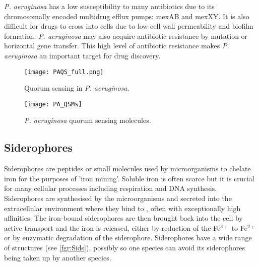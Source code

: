 \textit{P. aeruginosa} has a low susceptibility to many antibiotics due to its chromosomally encoded multidrug efflux pumps: mexAB and mexXY\cite{Poole2004}. It is also difficult for drugs to cross into cells due to low cell wall permeability and biofilm formation. \textit{P. aeruginosa} may also acquire antibiotic resistance by mutation or horizontal gene transfer\cite{cornelis2008pseudomonas}. This high level of antibiotic resistance makes \textit{P. aeruginosa} an important target for drug discovery.

\begin{figure}[H]
	\begin{center}
		\texttt{[image: PAQS\_full.png]}
		\caption{Quorum sensing in \textit{P. aeruginosa}\cite{Dubern2008}. \label{fgr:PA_QS}}
	\end{center}
\end{figure}


\begin{figure}[H]
	\begin{center}
		\texttt{[image: PA\_QSMs]}
		\caption{\textit{P. aeruginosa} quorum sensing molecules. \label{fgr:PA_QSMs}}
	\end{center}
\end{figure}




\subsection{Siderophores}

Siderophores are peptides or small molecules used by microorganisms to chelate iron for the purposes of 'iron mining'\cite{Hider2010}. Soluble iron is often scarce but it is crucial for many cellular processes including respiration and DNA synthesis. Siderophores are synthesised by the microorganisms and secreted into the extracellular environment where they bind to , often with exceptionally high affinities. The iron-bound siderophores are then brought back into the cell by active transport and the iron is released, either by reduction of the Fe$^{3+}$ to Fe$^{2+}$ or by enzymatic degradation of the siderophore. Siderophores have a wide range of structures (see \ref{fgr:Sids}), possibly so one species can avoid its siderophores being taken up by another species\cite{Seyedsayamdost2012}.

